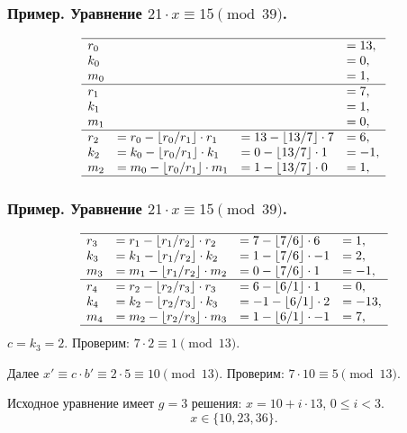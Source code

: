 \begin{frame}
    \frametitle{Пример. Уравнение $21\cdot x \equiv 15 \pmod{39}$.}
    
    \[
        \begin{array}[c]{llll}
            \hline
            r_0&&&=13,\\
            k_0&&&=0,\\
            m_0&&&=1,\\
            \hline
            r_1&&&=7,\\
            k_1&&&=1,\\
            m_1&&&=0,\\
            \hline
            r_2&=r_0 - \lfloor r_0/r_1\rfloor\cdot r_1&=13-\lfloor 13/7\rfloor\cdot 7&=6,\\
            k_2&=k_{0}-\lfloor r_{0}/r_{1}\rfloor\cdot k_{1}&=0-\lfloor 13/7\rfloor\cdot 1&=-1,\\
            m_2&=m_{0}-\lfloor r_{0}/r_{1}\rfloor\cdot m_{1}&=1-\lfloor 13/7\rfloor\cdot 0&=1,\\
            \hline
        \end{array}
    \]
\end{frame}


\begin{frame}
    \frametitle{Пример. Уравнение $21\cdot x \equiv 15 \pmod{39}$.}
    
    \[
        \begin{array}[c]{llll}
            \hline
            r_3&=r_{1} - \lfloor r_{1}/r_{2}\rfloor\cdot r_{2}&=7-\lfloor 7/6\rfloor\cdot 6&=1,\\
            k_3&=k_{1}-\lfloor r_{1}/r_{2}\rfloor\cdot k_{2}&=1-\lfloor 7/6\rfloor\cdot -1&=2,\\
            m_3&=m_{1}-\lfloor r_{1}/r_{2}\rfloor\cdot m_{2}&=0-\lfloor 7/6\rfloor\cdot 1&=-1,\\
            \hline
            r_4&=r_{2} - \lfloor r_{2}/r_{3}\rfloor\cdot r_{3}&=6-\lfloor 6/1\rfloor\cdot 1&=0,\\
            k_4&=k_{2}-\lfloor r_{2}/r_{3}\rfloor\cdot k_{3}&=-1-\lfloor 6/1\rfloor\cdot 2&=-13,\\
            m_4&=m_{2}-\lfloor r_{2}/r_{3}\rfloor\cdot m_{3}&=1-\lfloor 6/1\rfloor\cdot -1&=7,\\
            \hline
        \end{array}
    \]
    $c=k_3=2$. Проверим: $7\cdot 2 \equiv 1 \pmod{13}$. 

    Далее $x'\equiv c\cdot b'\equiv2\cdot 5\equiv 10\pmod{13}$. Проверим: $7\cdot 10\equiv 5\pmod{13}$.

    Исходное уравнение имеет $g=3$ решения: $x=10+i\cdot 13$, $0\leq i<3$. 
    \[x\in\{10, 23, 36\}.\]
    
\end{frame}



